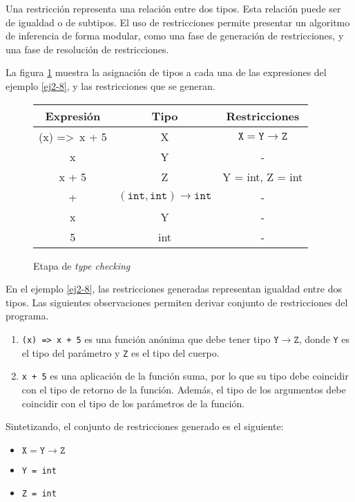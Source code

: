 Una restricción representa una relación entre dos tipos. Esta relación puede ser de igualdad o de subtipos. El uso de restricciones permite presentar un algoritmo de inferencia de forma modular, como una fase de generación de restricciones, y una fase de resolución de restricciones.

La figura \ref{tabla1} muestra la asignación de tipos a cada una de las expresiones del ejemplo \ref{ej2-8}, y las restricciones que se generan.


\begin{figure}[ht]
  \centering
  \ttfamily
  \begin{tabular}{c c c}
    Expresión & Tipo & Restricciones\\
    \hline
    (x) =>\ x + 5 & X & $\mathtt{X = Y \rightarrow Z}$\\
    x & Y & -\\
    x + 5 & Z & Y = int, Z = int\\
    + & $\mathtt{(int,int) \rightarrow int}$ & -\\
    x & Y & -\\
    5 & int & -\\
  \end{tabular}
  \caption{Etapa de \emph{type checking}}
  \label{tabla1}
\end{figure}

En el ejemplo \ref{ej2-8}, las restricciones generadas representan igualdad entre dos tipos. Las siguientes observaciones permiten derivar conjunto de restricciones del programa.

\begin{enumerate}
  \item \texttt{(x) =>\ x + 5} es una función anónima que debe tener tipo $\mathtt{Y \rightarrow Z}$, donde \texttt{Y} es el tipo del parámetro y \texttt{Z} es el tipo del cuerpo.
  \item \texttt{x + 5} es una aplicación de la función suma, por lo que su tipo debe coincidir con el tipo de retorno de la función. Además, el tipo de los argumentos debe coincidir con el tipo de los parámetros de la función.
\end{enumerate}

Sintetizando, el conjunto de restricciones generado es el siguiente:

\begin{itemize}
  \item $\mathtt{X = Y \rightarrow Z}$
  \item \texttt{Y = int}
  \item \texttt{Z = int}
\end{itemize}

